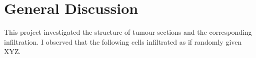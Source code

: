 
\chapter{General Discussion}  %

\ifpdf
    \graphicspath{{Discussion/}}
\else
    \graphicspath{{Introduction/Figs/Vector/}{Introduction/Figs/}}
\fi


This project investigated the structure of tumour sections and the corresponding infiltration. I observed that the following cells infiltrated as if randomly given XYZ.